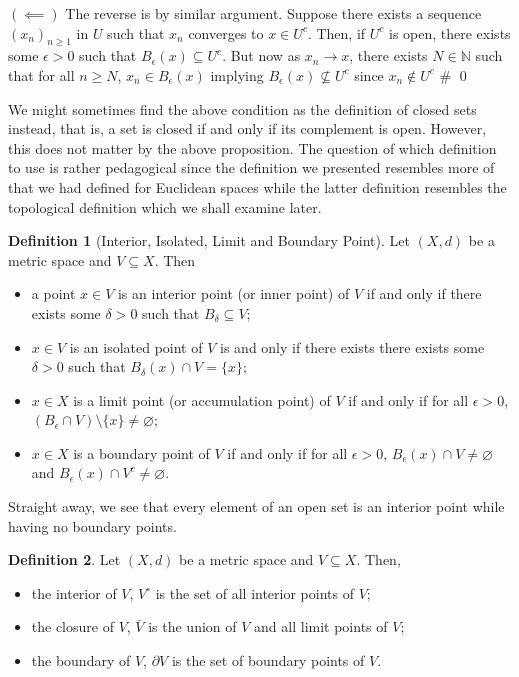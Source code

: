 \documentclass[
]{article}
\theoremstyle{definition}
\theoremstyle{definition}
\newtheorem{definition}{Definition}[section]
\begin{document}
\((\impliedby)\) The reverse is by similar argument. Suppose there
exists a sequence \((x_n)_{n \ge 1}\) in \(U\) such that \(x_n\)
converges to \(x \in U^c\). Then, if \(U^c\) is open, there exists some
\(\epsilon > 0\) such that \(B_\epsilon (x) \subseteq U^c\). But now as
\(x_n \to x\), there exists \(N \in \mathbb{N}\) such that for all
\(n \ge N\), \(x_n \in B_\epsilon(x)\) implying
\(B_\epsilon(x) \not\subseteq U^c\) since \(x_n \not\in U^c\) \# \qed

We might sometimes find the above condition as the definition of closed
sets instead, that is, a set is closed if and only if its complement is
open. However, this does not matter by the above proposition. The
question of which definition to use is rather pedagogical since the
definition we presented resembles more of that we had defined for
Euclidean spaces while the latter definition resembles the topological
definition which we shall examine later.

\begin{definition}[Interior, Isolated, Limit and Boundary Point]
  Let \((X, d)\) be a metric space and \(V \subseteq X\). Then
  \begin{itemize}
    \item a point \(x \in V\) is an interior point (or inner point) of \(V\) if 
      and only if there exists some \(\delta > 0\) such that \(B_\delta \subseteq V\);
    \item \(x \in V\) is an isolated point of \(V\) is and only if there exists 
      there exists some \(\delta > 0\) such that \(B_\delta(x) \cap V = \{x\}\);
    \item \(x \in X\) is a limit point (or accumulation point) of \(V\) if and 
      only if for all \(\epsilon > 0\), 
      \((B_\epsilon \cap V) \setminus \{x\} \neq \varnothing\);
    \item \(x \in X\) is a boundary point of \(V\) if and only if for all 
      \(\epsilon > 0\), \(B_\epsilon(x) \cap V \neq \varnothing\) and 
      \(B_\epsilon(x) \cap V^c \neq \varnothing\).
  \end{itemize}
\end{definition}

Straight away, we see that every element of an open set is an interior
point while having no boundary points.

\begin{definition}
  Let \((X, d)\) be a metric space and \(V \subseteq X\). Then, 
  \begin{itemize}
    \item the interior of \(V\), \(V^\circ\) is the set of all interior points of \(V\);
    \item the closure of \(V\), \(\bar{V}\) is the union of \(V\) and all limit points of \(V\);
    \item the boundary of \(V\), \(\partial V\) is the set of boundary points of \(V\).
  \end{itemize}
\end{definition}
\end{document}
